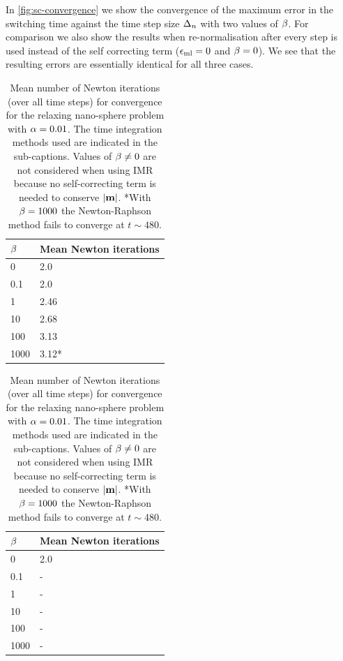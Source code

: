 In \cref{fig:sc-convergence} we show the convergence of the maximum error in the switching time against the time step size $\Delta_{n}$ with two values of $\beta$.
For comparison we also show the results when re-normalisation after every step is used instead of the self correcting term (\ie $\epsilon_{\mathrm{ml}} = 0$ and $\beta = 0$).
We see that the resulting errors are essentially identical for all three cases.

\begin{table}
  \begin{subtable}{.5\textwidth}
    \centering
    \begin{tabular}{ll}
      $\beta$ & Mean Newton iterations \\
      \hline
      0 & 2.0 \\
      0.1 & 2.0 \\
      1 & 2.46 \\
      10 & 2.68 \\
      100 & 3.13 \\
      1000 & 3.12* \\
    \end{tabular}%
    \caption{Solved with BDF2 and $\ntol = 10^{-8}$. Magnetisation length is enforced by use of the self-correcting LLG.}
  \end{subtable}%
  \begin{subtable}{.5\textwidth}
    \centering
    \begin{tabular}{ll}
      $\beta$ & Mean Newton iterations \\
      \hline
      0 & 2.0 \\
      0.1 & - \\
      1 & - \\
      10 & - \\
      100 & - \\
      1000 & - \\
    \end{tabular}%
    \vfill
    \caption{Solved with IMR and $\ntol = 10^{-12}$}
  \end{subtable}%
  \caption{
    Mean number of Newton iterations (over all time steps) for convergence
    for the relaxing nano-sphere problem with
    $\alpha = 0.01$.
    The time integration methods used are indicated in the sub-captions.
    Values of $\beta \neq 0$ are not considered when using IMR because no self-correcting term is needed to conserve $\left|{\boldsymbol{\mathrm{m}}} \right|$.
    *With $\beta = 1000$ the Newton-Raphson method fails to converge at $t \sim 480$.
  }
  \label{tab:sc-newton-iters}
\end{table}


